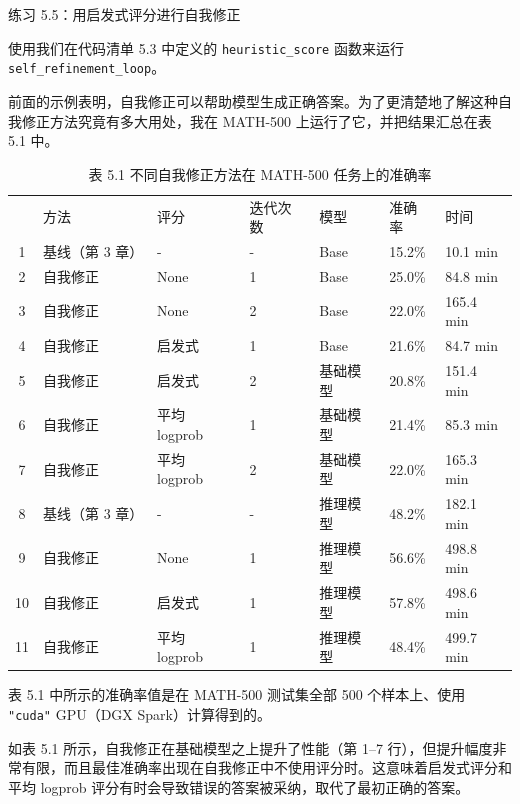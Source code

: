 \begin{mySidebar}{练习 5.5：用启发式评分进行自我修正}

使用我们在代码清单 5.3 中定义的 \texttt{heuristic\_score} 函数来运行 \texttt{self\_refinement\_loop}。

\end{mySidebar}

前面的示例表明，自我修正可以帮助模型生成正确答案。为了更清楚地了解这种自我修正方法究竟有多大用处，我在 MATH-500 上运行了它，并把结果汇总在表 5.1 中。

\begin{table}[htbp]
\centering\small
\centering
\caption{表 5.1 不同自我修正方法在 MATH-500 任务上的准确率}
\begin{tabularx}{\linewidth}{@{}c@{}XXXXXX}
\toprule
 & 方法 & 评分 & 迭代次数 & 模型 & 准确率 & 时间 \\
1 & 基线（第 3 章） & - & - & Base & 15.2\% & 10.1 min \\
2 & 自我修正 & None & 1 & Base & 25.0\% & 84.8 min \\
3 & 自我修正 & None & 2 & Base & 22.0\% & 165.4 min \\
4 & 自我修正 & 启发式 & 1 & Base & 21.6\% & 84.7 min \\
5 & 自我修正 & 启发式 & 2 & 基础模型 & 20.8\% & 151.4 min \\
6 & 自我修正 & 平均 logprob & 1 & 基础模型 & 21.4\% & 85.3 min \\
7 & 自我修正 & 平均 logprob & 2 & 基础模型 & 22.0\% & 165.3 min \\ \addlinespace

8 & 基线（第 3 章） & - & - & 推理模型 & 48.2\% & 182.1 min \\
9 & 自我修正 & None & 1 & 推理模型 & 56.6\% & 498.8 min \\
10 & 自我修正 & 启发式 & 1 & 推理模型 & 57.8\% & 498.6 min \\
11 & 自我修正 & 平均 logprob & 1 & 推理模型 & 48.4\% & 499.7 min \\ \bottomrule
\end{tabularx}
\end{table}

表 5.1 中所示的准确率值是在 MATH-500 测试集全部 500 个样本上、使用 \texttt{"}\texttt{cuda}\texttt{"} GPU（DGX Spark）计算得到的。

如表 5.1 所示，自我修正在基础模型之上提升了性能（第 1–7 行），但提升幅度非常有限，而且最佳准确率出现在自我修正中不使用评分时。这意味着启发式评分和平均 logprob 评分有时会导致错误的答案被采纳，取代了最初正确的答案。

